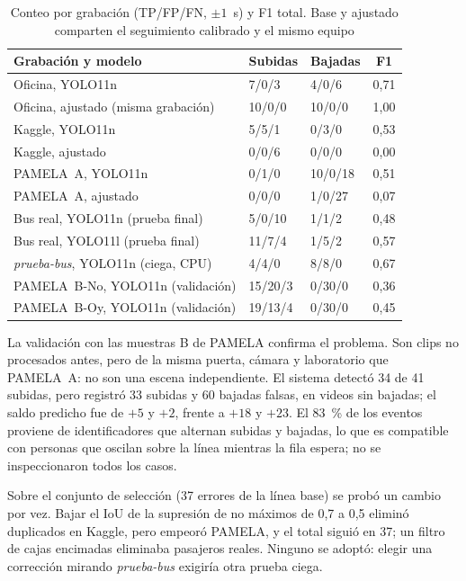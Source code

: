 \documentclass[conference,a4paper]{IEEEtran}
\begin{document}
\begin{table}[!t]
\caption{Conteo por grabación (TP/FP/FN, $\pm1$~s) y F1 total. Base y ajustado comparten el seguimiento calibrado y el mismo equipo}
\label{tab:res}
\centering\scriptsize
\begin{tabular}{@{}lllc@{}}
\toprule
Grabación y modelo & Subidas & Bajadas & F1\\
\midrule
Oficina, YOLO11n & 7/0/3 & 4/0/6 & 0,71\\
Oficina, ajustado (misma grabación) & 10/0/0 & 10/0/0 & 1,00\\
Kaggle, YOLO11n & 5/5/1 & 0/3/0 & 0,53\\
Kaggle, ajustado & 0/0/6 & 0/0/0 & 0,00\\
PAMELA~A, YOLO11n & 0/1/0 & 10/0/18 & 0,51\\
PAMELA~A, ajustado & 0/0/0 & 1/0/27 & 0,07\\
\midrule
Bus real, YOLO11n (prueba final) & 5/0/10 & 1/1/2 & 0,48\\
Bus real, YOLO11l (prueba final) & 11/7/4 & 1/5/2 & 0,57\\
\emph{prueba-bus}, YOLO11n (ciega, CPU) & 4/4/0 & 8/8/0 & 0,67\\
PAMELA~B-No, YOLO11n (validación) & 15/20/3 & 0/30/0 & 0,36\\
PAMELA~B-Oy, YOLO11n (validación) & 19/13/4 & 0/30/0 & 0,45\\
\bottomrule
\end{tabular}
\end{table}

La validación con las muestras B de PAMELA confirma el problema. Son clips no procesados antes, pero de la misma puerta, cámara y laboratorio que PAMELA~A: no son una escena independiente. El sistema detectó 34 de 41 subidas, pero registró 33 subidas y 60 bajadas falsas, en videos sin bajadas; el saldo predicho fue de $+5$ y $+2$, frente a $+18$ y $+23$. El 83~\% de los eventos proviene de identificadores que alternan subidas y bajadas, lo que es compatible con personas que oscilan sobre la línea mientras la fila espera; no se inspeccionaron todos los casos.

Sobre el conjunto de selección (37 errores de la línea base) se probó un cambio por vez. Bajar el IoU de la supresión de no máximos de 0,7 a 0,5 eliminó duplicados en Kaggle, pero empeoró PAMELA, y el total siguió en 37; un filtro de cajas encimadas eliminaba pasajeros reales. Ninguno se adoptó: elegir una corrección mirando \emph{prueba-bus} exigiría otra prueba ciega.
\end{document}
